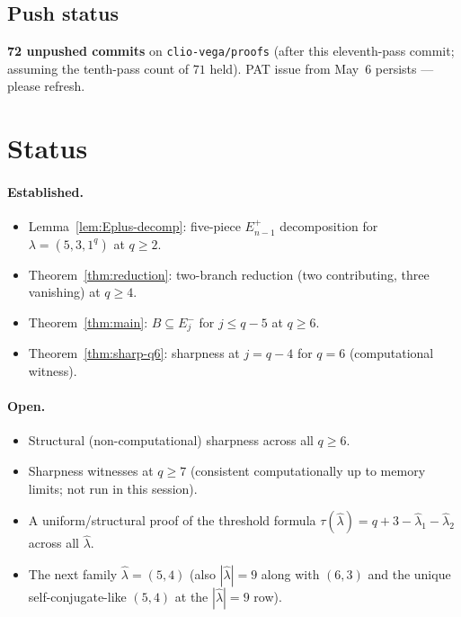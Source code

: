 \documentclass[11pt]{article}
\theoremstyle{definition}
\newcommand{\hatl}{\widehat\lambda}
\begin{document}
\subsection{Push status}

\textbf{72 unpushed commits} on \texttt{clio-vega/proofs} (after this
eleventh-pass commit; assuming the tenth-pass count of $71$ held).
PAT issue from May~6 persists --- please refresh.

\section{Status}\label{sec:status}

\paragraph{Established.}
\begin{itemize}[topsep=0.3em,itemsep=0.1em]
\item Lemma~\ref{lem:Eplus-decomp}: five-piece $E^+_{n-1}$
   decomposition for $\lambda = (5, 3, 1^q)$ at $q \ge 2$.
\item Theorem~\ref{thm:reduction}: two-branch reduction (two
   contributing, three vanishing) at $q \ge 4$.
\item Theorem~\ref{thm:main}: $B \subseteq E_j^-$ for $j \le q - 5$
   at $q \ge 6$.
\item Theorem~\ref{thm:sharp-q6}: sharpness at $j = q - 4$ for
   $q = 6$ (computational witness).
\end{itemize}

\paragraph{Open.}
\begin{itemize}[topsep=0.3em,itemsep=0.1em]
\item Structural (non-computational) sharpness across all $q \ge 6$.
\item Sharpness witnesses at $q \ge 7$ (consistent computationally
   up to memory limits; not run in this session).
\item A uniform/structural proof of the threshold formula
   $\tau(\hatl) = q + 3 - \hatl_1 - \hatl_2$ across all $\hatl$.
\item The next family $\hatl = (5, 4)$ (also $|\hatl| = 9$ along with
   $(6, 3)$ and the unique self-conjugate-like $(5, 4)$ at the
   $|\hatl| = 9$ row).
\end{itemize}
\end{document}
